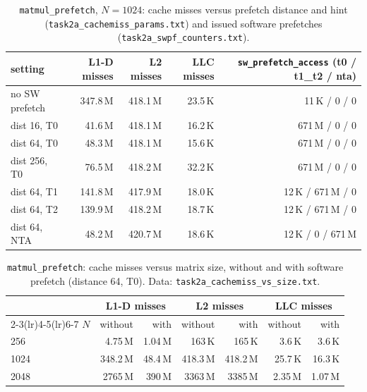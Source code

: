 \documentclass[11pt,a4paper]{article}
\begin{document}
\begin{table}[H]
\centering\small
\caption{\texttt{matmul\_prefetch}, $N=1024$: cache misses versus prefetch distance and hint (\texttt{task2a\_cachemiss\_params.txt}) and issued software prefetches (\texttt{task2a\_swpf\_counters.txt}).}
\label{tab:2a-params}
\begin{tabular}{l rrr r}
\toprule
setting & L1-D misses & L2 misses & LLC misses & \texttt{sw\_prefetch\_access} (t0 / t1\_t2 / nta) \\
\midrule
no SW prefetch          & 347.8\,M & 418.1\,M & 23.5\,K & 11\,K / 0 / 0 \\
dist 16, T0             & 41.6\,M  & 418.1\,M & 16.2\,K & 671\,M / 0 / 0 \\
dist 64, T0             & 48.3\,M  & 418.1\,M & 15.6\,K & 671\,M / 0 / 0 \\
dist 256, T0            & 76.5\,M  & 418.2\,M & 32.2\,K & 671\,M / 0 / 0 \\
dist 64, T1             & 141.8\,M & 417.9\,M & 18.0\,K & 12\,K / 671\,M / 0 \\
dist 64, T2             & 139.9\,M & 418.2\,M & 18.7\,K & 12\,K / 671\,M / 0 \\
dist 64, NTA            & 48.2\,M  & 420.7\,M & 18.6\,K & 12\,K / 0 / 671\,M \\
\bottomrule
\end{tabular}
\end{table}

\begin{table}[H]
\centering\small
\caption{\texttt{matmul\_prefetch}: cache misses versus matrix size, without and with software prefetch (distance 64, T0). Data: \texttt{task2a\_cachemiss\_vs\_size.txt}.}
\label{tab:2a-miss-size}
\begin{tabular}{l rr rr rr}
\toprule
& \multicolumn{2}{c}{L1-D misses} & \multicolumn{2}{c}{L2 misses} & \multicolumn{2}{c}{LLC misses} \\
\cmidrule(lr){2-3}\cmidrule(lr){4-5}\cmidrule(lr){6-7}
$N$ & without & with & without & with & without & with \\
\midrule
256  & 4.75\,M & 1.04\,M & 163\,K & 165\,K & 3.6\,K & 3.6\,K \\
1024 & 348.2\,M & 48.4\,M & 418.3\,M & 418.2\,M & 25.7\,K & 16.3\,K \\
2048 & 2765\,M & 390\,M & 3363\,M & 3385\,M & 2.35\,M & 1.07\,M \\
\bottomrule
\end{tabular}
\end{table}
\end{document}
